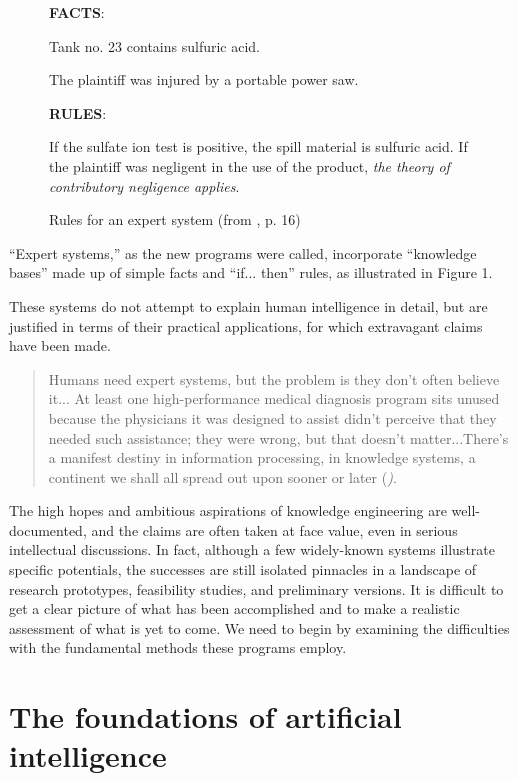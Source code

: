 \documentclass[12pt]{article}
\begin{document}
\newpage

\begin{figure}
{\bf FACTS}:

\medskip
\noindent
Tank no. 23 contains sulfuric acid.

\noindent
The plaintiff was injured by a portable power saw.

\medskip

{\bf RULES}:

\medskip
\noindent
If the sulfate ion test is positive, the spill material is sulfuric acid. If the plaintiff was negligent in the use of the product, {\it the theory of contributory negligence applies}.

\caption{Rules for an expert system (from \cite{waterman1986}, p. 16)}
\end{figure}

\goodbreak

``Expert systems,'' as the new programs were called, incorporate ``knowledge bases'' made up of simple facts and ``if... then'' rules, as illustrated in Figure 1.

These systems do not attempt to explain human intelligence in detail, but are justified in terms of their practical applications, for which extravagant claims have been made.

\begin{quote}
Humans need expert systems, but the problem is they don't often believe it... At least one high-performance medical diagnosis program sits unused because the physicians it was designed to assist didn't perceive that they needed such assistance; they were wrong, but that doesn't matter...There's a manifest destiny in information processing, in knowledge systems, a continent we shall all spread out upon sooner or later ({\it \cite{mccorduck1983})}.
\end{quote}

The high hopes and ambitious aspirations of knowledge engineering are well-documented, and the claims are often taken at face value, even in serious intellectual discussions. In fact, although a few widely-known systems illustrate specific potentials, the successes are still isolated pinnacles in a landscape of research prototypes, feasibility studies, and preliminary versions. It is difficult to get a clear picture of what has been accomplished and to make a realistic assessment of what is yet to come. We need to begin by examining the difficulties with the fundamental methods these programs employ.

\section{The foundations of artificial intelligence}
\end{document}
